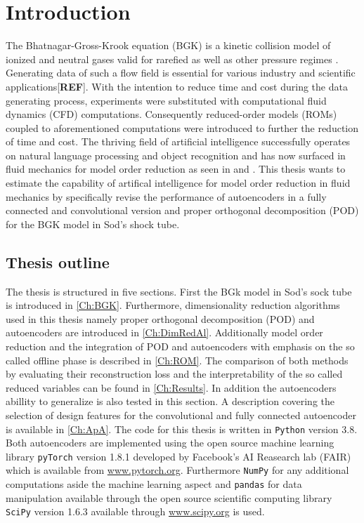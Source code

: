
\chapter{Introduction}
\label{CH:intro}


The Bhatnagar-Gross-Krook equation (BGK) is a kinetic collision model of ionized and neutral gases valid for rarefied as well as other pressure regimes \cite{BGK}. Generating data of such a flow field is essential for various industry and scientific applications[\textbf{REF}]. With the intention to reduce time and cost during the data generating process, experiments were substituted with computational fluid dynamics (CFD) computations. Consequently reduced-order models (ROMs) coupled to aforementioned computations were introduced to further the reduction of time and cost. The thriving field of artificial intelligence successfully operates on natural language processing and object recognition and has now surfaced in fluid mechanics for model order reduction as seen in \cite{Carlberg} and \cite{bukka2020assessment}. This thesis wants to estimate the capability of artifical intelligence for model order reduction in fluid mechanics by specifically revise the performance of autoencoders in a fully connected and convolutional version and proper orthogonal decomposition (POD) for the BGK model in Sod's shock tube.  
\section{Thesis outline}

The thesis is structured in five sections. First the BGk model in Sod's sock tube is introduced in \cref{Ch:BGK}. Furthermore, dimensionality reduction algorithms used in this thesis namely proper orthogonal decomposition (POD) and autoencoders are introduced in \cref{Ch:DimRedAl}. Additionally model order reduction and the integration of POD and autoencoders with emphasis on the so called offline phase is described in \cref{Ch:ROM}. The comparison of both methods by evaluating their reconstruction loss and the interpretability of the so called reduced variables can be found in \cref{Ch:Results}. In addition the autoencoders abillity to generalize is also tested in this section. A description covering the selection of design features for the convolutional and fully connected autoencoder is available in \cref{Ch:ApA}. The code for this thesis is written in \texttt{Python} version 3.8. Both autoencoders are implemented using the open source machine learning library \texttt{pyTorch} version 1.8.1 developed by Facebook's AI Reasearch lab (FAIR) which is available from \url{www.pytorch.org}. Furthermore \texttt{NumPy} for any additional computations aside the machine learning aspect and \texttt{pandas} for data manipulation available through the open source scientific computing library \texttt{SciPy} version 1.6.3 available through \url{www.scipy.org} is used.  
